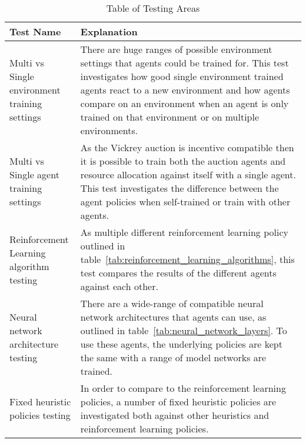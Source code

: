 \begin{table}[h]
    \centering
    \begin{tabular}{|p{4cm}|p{11cm}|} \hline
        Test Name & Explanation \\ \hline
        Multi vs Single environment training settings & There are huge ranges of possible environment settings that
            agents could be trained for. This test investigates how good single environment trained agents react to
            a new environment and how agents compare on an environment when an agent is only trained on that
            environment or on multiple environments. \\ \hline
        Multi vs Single agent training settings & As the Vickrey auction is incentive compatible then it is
            possible to train both the auction agents and resource allocation against itself with a single agent. This
            test investigates the difference between the agent policies when self-trained or train with other
            agents. \\ \hline
        Reinforcement Learning algorithm testing & As multiple different reinforcement learning policy outlined in
            table~\ref{tab:reinforcement_learning_algorithms}, this test compares the results of the different agents
            against each other. \\ \hline
        Neural network architecture testing & There are a wide-range of compatible neural network architectures that
            agents can use, as outlined in table~\ref{tab:neural_network_layers}. To use these agents, the underlying
            policies are kept the same with a range of model networks are trained. \\ \hline
        Fixed heuristic policies testing & In order to compare to the reinforcement learning policies, a number of
            fixed heuristic policies are investigated both against other heuristics and reinforcement learning
            policies. \\ \hline
    \end{tabular}
    \caption{Table of Testing Areas}
    \label{tab:testing_areas}
\end{table}
